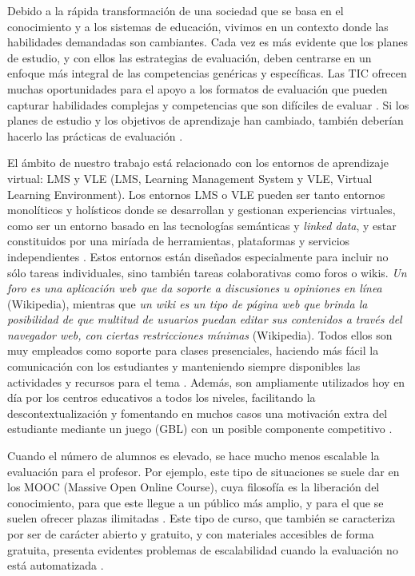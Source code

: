 Debido a la rápida transformación de una sociedad que se basa en el conocimiento y a los sistemas de educación, vivimos en un contexto donde las habilidades demandadas son cambiantes. Cada vez es más evidente que los planes de estudio, y con ellos las estrategias de evaluación, deben centrarse en un enfoque más integral de las competencias genéricas y específicas. Las TIC ofrecen muchas oportunidades para el apoyo a los formatos de evaluación que pueden capturar habilidades complejas y competencias que son difíciles de evaluar \cite{Redecker:2013}. Si los planes de estudio y los objetivos de aprendizaje han cambiado, también deberían hacerlo las prácticas de evaluación \cite{Cachia:2011}.

El ámbito de nuestro trabajo está relacionado con los entornos de aprendizaje virtual: LMS y VLE (LMS, Learning Management System y VLE, Virtual Learning Environment). Los entornos LMS o VLE pueden ser tanto entornos monolíticos y holísticos donde se desarrollan y gestionan experiencias virtuales, como ser un entorno basado en las tecnologías semánticas y \emph{linked data}, y estar constituidos por una miríada de herramientas, plataformas y servicios independientes \cite{Dodero:2013}. Estos entornos están diseñados especialmente para incluir no sólo tareas individuales, sino también tareas colaborativas como foros o wikis. \emph{Un foro es una aplicación web que da soporte a discusiones u opiniones en línea} (Wikipedia), mientras que \emph{un wiki es un tipo de página web que brinda la posibilidad de que multitud de usuarios puedan editar sus contenidos a través del navegador web, con ciertas restricciones mínimas} (Wikipedia). Todos ellos son muy empleados como soporte para clases presenciales, haciendo más fácil la comunicación con los estudiantes y manteniendo siempre disponibles las actividades y recursos para el tema \cite{Zafra:2011, Munkhchimeg:2013}. Además, son ampliamente utilizados hoy en día por los centros educativos a todos los niveles, facilitando la descontextualización y fomentando en muchos casos una motivación extra del estudiante mediante un juego (GBL) con un posible componente competitivo \cite{Bellotti:2013,Berns:2013,Palomo-Duarte:2012}.

Cuando el número de alumnos es elevado, se hace mucho menos escalable la evaluación para el profesor. Por ejemplo, este tipo de situaciones se suele dar en los MOOC (Massive Open Online Course), cuya filosofía es la liberación del conocimiento, para que este llegue a un público más amplio, y para el que se suelen ofrecer plazas ilimitadas \cite{Lugton:2012, Mor:2013}. Este tipo de curso, que también se caracteriza por ser de carácter abierto y gratuito, y con materiales accesibles de forma gratuita, presenta evidentes problemas de escalabilidad cuando la evaluación no está automatizada \cite{Johnson:2013}.

